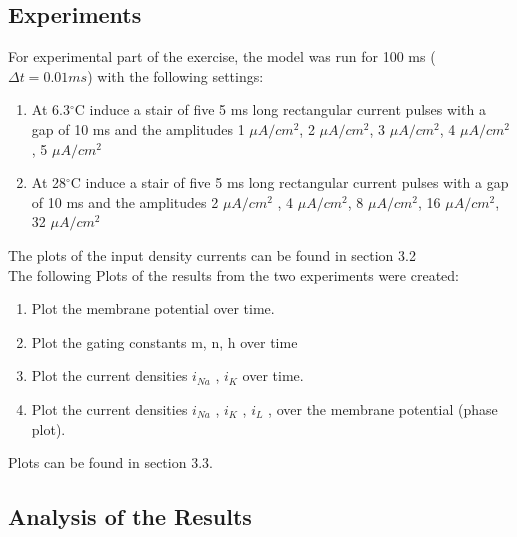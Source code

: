 \documentclass{scrartcl}			%
\begin{document}
\subsection{Experiments}
For experimental part of the exercise, the model was run for 100 ms (${\Delta t = 0.01 ms}$) with the following settings:
\begin{enumerate}
	\item At 6.3$^{\circ}$C induce a stair of five 5 ms long rectangular current pulses with a gap of
	10 ms and the amplitudes 1 $\mu A/cm^2$, 2 $\mu A/cm^2$, 3 $\mu A/cm^2$, 4 $\mu A/cm^2$, 5 $\mu A/cm^2$
	\item At 28$^{\circ}$C induce a stair of five 5 ms long rectangular current pulses with a gap of
	10 ms and the amplitudes 2 $\mu A/cm^2$ , 4 $\mu A/cm^2$, 8 $\mu A/cm^2$, 16 $\mu A/cm^2$, 32 $\mu A/cm^2$
\end{enumerate}
The plots of the input density currents can be found in section 3.2\\

The following Plots of the results from the two experiments were created:
\begin{enumerate}
	\item Plot the membrane potential over time.
	\item Plot the gating constants m, n, h over time
	\item Plot the current densities $i_{Na}$ , $i_K$ over time.
	\item Plot the current densities $i_{Na}$ , $i_K$ , $i_L$ , over the membrane potential (phase plot).
\end{enumerate}

Plots can be found in section 3.3.

\subsection{Analysis of the Results}
\end{document}
